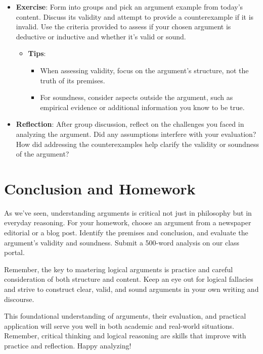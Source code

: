 \documentclass{article}
\begin{document}
\begin{itemize}
    \item \textbf{Exercise}: Form into groups and pick an argument example from today’s content. Discuss its validity and attempt to provide a counterexample if it is invalid. Use the criteria provided to assess if your chosen argument is deductive or inductive and whether it's valid or sound.
          \begin{itemize}
              \item \textbf{Tips}:
                    \begin{itemize}
                        \item When assessing validity, focus on the argument's structure, not the truth of its premises.
                        \item For soundness, consider aspects outside the argument, such as empirical evidence or additional information you know to be true.
                    \end{itemize}
          \end{itemize}
    \item \textbf{Reflection}: After group discussion, reflect on the challenges you faced in analyzing the argument. Did any assumptions interfere with your evaluation? How did addressing the counterexamples help clarify the validity or soundness of the argument?
\end{itemize}

\section{Conclusion and Homework}

As we've seen, understanding arguments is critical not just in philosophy but in everyday reasoning. For your homework, choose an argument from a newspaper editorial or a blog post. Identify the premises and conclusion, and evaluate the argument's validity and soundness. Submit a 500-word analysis on our class portal.

Remember, the key to mastering logical arguments is practice and careful consideration of both structure and content. Keep an eye out for logical fallacies and strive to construct clear, valid, and sound arguments in your own writing and discourse.

This foundational understanding of arguments, their evaluation, and practical application will serve you well in both academic and real-world situations. Remember, critical thinking and logical reasoning are skills that improve with practice and reflection. Happy analyzing!
\end{document}

